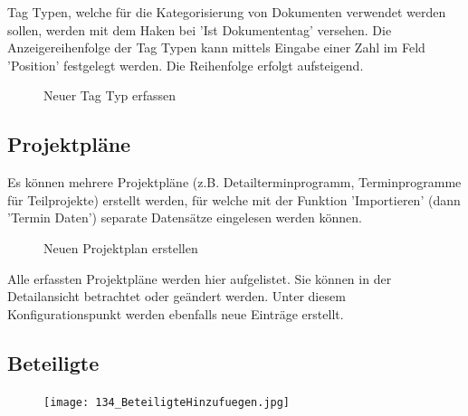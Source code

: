 Tag Typen, welche für die Kategorisierung von Dokumenten verwendet werden sollen, werden mit dem Haken bei 'Ist Dokumententag' versehen. Die Anzeigereihenfolge der Tag Typen kann mittels Eingabe einer Zahl im Feld 'Position' festgelegt werden. Die Reihenfolge erfolgt aufsteigend.

\begin{figure}[H]
\caption{Neuer Tag Typ erfassen}
\end{figure}

\subsection{Projektpläne}

Es können mehrere Projektpläne (z.B. Detailterminprogramm, Terminprogramme für Teilprojekte) erstellt werden, für welche mit der Funktion 'Importieren' (dann  'Termin Daten') separate Datensätze eingelesen werden können.

\begin{figure}[H]
\caption{Neuen Projektplan erstellen}
\end{figure}

Alle erfassten Projektpläne werden hier aufgelistet. Sie können in der Detailansicht betrachtet oder geändert werden. Unter diesem Konfigurationspunkt werden ebenfalls neue Einträge erstellt.

\subsection{Beteiligte}

\begin{figure}
\vspace{-25pt}
\texttt{[image: 134\_BeteiligteHinzufuegen.jpg]}
\end{figure}

